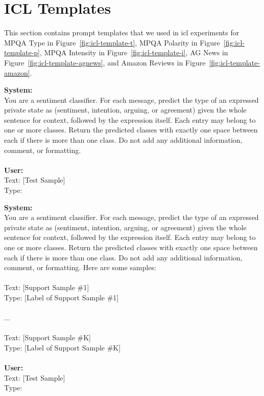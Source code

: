 \documentclass[11pt]{article}
\theoremstyle{definition}
\begin{document}
\section{ICL Templates}
\label{appendix:prompts}

This section contains prompt templates that we used in \gls*{icl} experiments for MPQA Type in Figure~\ref{fig:icl-template-t}, MPQA Polarity in Figure~\ref{fig:icl-template-p}, MPQA Intensity in Figure~\ref{fig:icl-template-i}, AG News in Figure~\ref{fig:icl-template-agnews}, and Amazon Reviews in Figure~\ref{fig:icl-template-amazon}.


\begin{figure*} [htb]
    \centering
    \begin{mdframed}
    \small
    \textbf{System:} \\
    You are a sentiment classifier. For each message, predict the type of an expressed private state as (sentiment, intention, arguing, or agreement) given the whole sentence for context, followed by the expression itself. Each entry may belong to one or more classes. Return the predicted classes with exactly one space between each if there is more than one class. Do not add any additional information, comment, or formatting. \\
    \\
    \textbf{User:} \\
    Text: [Test Sample] \\
    Type: 
    
    \end{mdframed}
    \begin{mdframed}
    \small
    \textbf{System:} \\
    You are a sentiment classifier. For each message, predict the type of an expressed private state as (sentiment, intention, arguing, or agreement) given the whole sentence for context, followed by the expression itself. Each entry may belong to one or more classes. Return the predicted classes with exactly one space between each if there is more than one class. Do not add any additional information, comment, or formatting. Here are some samples: \\
    \\
    Text: [Support Sample \#1] \\
    Type: [Label of Support Sample \#1] \\
    \\
    ... \\
    \\
    Text: [Support Sample \#K] \\
    Type: [Label of Support Sample \#K] \\
    \\
    \textbf{User:} \\
    Text: [Test Sample] \\
    Type:     
    \end{mdframed}
	\caption{Prompt templates for {\bf MPQA Type} task. The upper box shows a sample for zero-shot learning, and the lower one shows a sample for $K$-shot learning.}
	\label{fig:icl-template-t}
\end{figure*}
\end{document}
